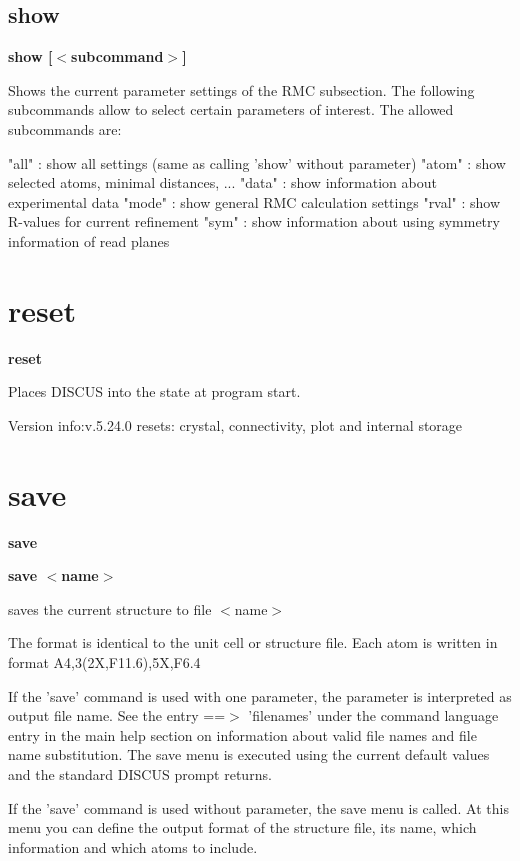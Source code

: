 \subsection*{show}
{\bf show [$ <$subcommand$> $] \par }
\par
\vspace{3pt}
Shows the current parameter settings of the RMC subsection. The following 
subcommands allow to select certain parameters of interest. The allowed 
subcommands are: 
\par
\begin{MacVerbatim}
"all"  : show all settings (same as calling 'show' without parameter)
"atom" : show selected atoms, minimal distances, ...
"data" : show information about experimental data
"mode" : show general RMC calculation settings
"rval" : show R-values for current refinement
"sym"  : show information about using symmetry information of read planes
\end{MacVerbatim}
\section{reset}
{\bf reset \par }
\par
\vspace{3pt}
Places DISCUS into the state at program start. 
\par
Version info:v.5.24.0 
     resets: crystal, connectivity, plot and internal storage 
\section{save}
{\bf save \par }
{\bf save $ <$name$> $ \par }
\par
\vspace{3pt}
saves the current structure to file $ <$name$> $ 
\par
The format is identical to the unit cell or structure file. Each 
atom is written in format A4,3(2X,F11.6),5X,F6.4 
\par
If the 'save' command is used with one parameter, the 
parameter is interpreted as output file name. See the entry 
==$> $ 'filenames' under the command language entry in the main help 
section on information about valid file names and file name substitution. 
The save menu is executed using the current default values and the 
standard DISCUS prompt returns. 
\par
If the 'save' command is used without parameter, the save menu is 
called. At this menu you can define the output format of the structure 
file, its name, which information and which atoms to include. 
\par
